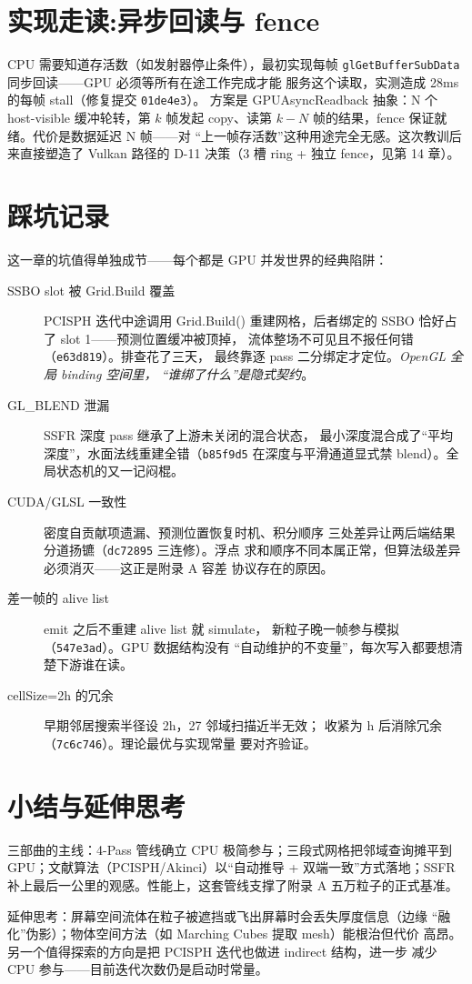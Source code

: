\section{实现走读:异步回读与 fence}

CPU 需要知道存活数（如发射器停止条件），最初实现每帧
\texttt{glGetBufferSubData} 同步回读——GPU 必须等所有在途工作完成才能
服务这个读取，实测造成 28ms 的每帧 stall（修复提交 \texttt{01de4e3}）。
方案是 GPUAsyncReadback 抽象：N 个 host-visible 缓冲轮转，第 $k$ 帧发起
copy、读第 $k-N$ 帧的结果，fence 保证就绪。代价是数据延迟 N 帧——对
``上一帧存活数''这种用途完全无感。这次教训后来直接塑造了 Vulkan 路径的
D-11 决策（3 槽 ring + 独立 fence，见第 14 章）。

\section{踩坑记录}

这一章的坑值得单独成节——每个都是 GPU 并发世界的经典陷阱：

\begin{description}
  \item[SSBO slot 被 Grid.Build 覆盖] PCISPH 迭代中途调用 Grid.Build()
        重建网格，后者绑定的 SSBO 恰好占了 slot 1——预测位置缓冲被顶掉，
        流体整场不可见且不报任何错（\texttt{e63d819}）。排查花了三天，
        最终靠逐 pass 二分绑定才定位。\emph{OpenGL 全局 binding 空间里，
        ``谁绑了什么''是隐式契约}。
  \item[GL\_BLEND 泄漏] SSFR 深度 pass 继承了上游未关闭的混合状态，
        最小深度混合成了``平均深度''，水面法线重建全错（\texttt{b85f9d5}
        在深度与平滑通道显式禁 blend）。全局状态机的又一记闷棍。
  \item[CUDA/GLSL 一致性] 密度自贡献项遗漏、预测位置恢复时机、积分顺序
        三处差异让两后端结果分道扬镳（\texttt{dc72895} 三连修）。浮点
        求和顺序不同本属正常，但算法级差异必须消灭——这正是附录 A 容差
        协议存在的原因。
  \item[差一帧的 alive list] emit 之后不重建 alive list 就 simulate，
        新粒子晚一帧参与模拟（\texttt{547e3ad}）。GPU 数据结构没有
        ``自动维护的不变量''，每次写入都要想清楚下游谁在读。
  \item[cellSize=2h 的冗余] 早期邻居搜索半径设 2h，27 邻域扫描近半无效；
        收紧为 h 后消除冗余（\texttt{7c6c746}）。理论最优与实现常量
        要对齐验证。
\end{description}

\section{小结与延伸思考}

三部曲的主线：4-Pass 管线确立 CPU 极简参与；三段式网格把邻域查询摊平到
GPU；文献算法（PCISPH/Akinci）以``自动推导 + 双端一致''方式落地；SSFR
补上最后一公里的观感。性能上，这套管线支撑了附录 A 五万粒子的正式基准。

延伸思考：屏幕空间流体在粒子被遮挡或飞出屏幕时会丢失厚度信息（边缘
``融化''伪影）；物体空间方法（如 Marching Cubes 提取 mesh）能根治但代价
高昂。另一个值得探索的方向是把 PCISPH 迭代也做进 indirect 结构，进一步
减少 CPU 参与——目前迭代次数仍是启动时常量。
